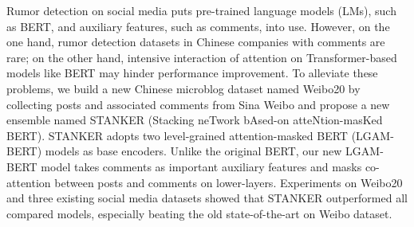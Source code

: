 Rumor detection on social media puts pre-trained language models (LMs), such as BERT, and auxiliary features, such as comments, into use. However, on the one hand, rumor detection datasets in Chinese companies with comments are rare; on the other hand, intensive interaction of attention on Transformer-based models like BERT may hinder performance improvement. To alleviate these problems, we build a new Chinese microblog dataset named Weibo20 by collecting posts and associated comments from Sina Weibo and propose a new ensemble named STANKER (Stacking neTwork bAsed-on atteNtion-masKed BERT). STANKER adopts two level-grained attention-masked BERT (LGAM-BERT) models as base encoders. Unlike the original BERT, our new LGAM-BERT model takes comments as important auxiliary features and masks co-attention between posts and comments on lower-layers. Experiments on Weibo20 and three existing social media datasets showed that STANKER  outperformed all compared models, especially beating the old state-of-the-art on Weibo dataset.
